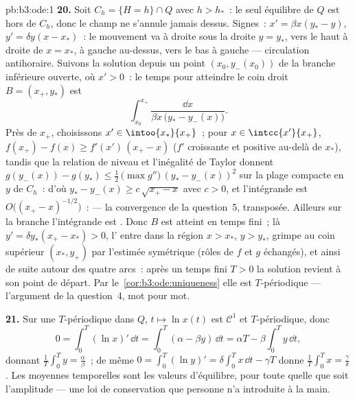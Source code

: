 \begin{solution}{pb:b3:ode:1}
\textbf{20.} Soit $C_h = \{H = h\}\cap Q$ avec $h > h_*$~:
le seul équilibre de $Q$ est hors de $C_h$, donc le champ
ne s'annule jamais dessus. Signes~: $x' = \beta x(y_* - y)$,
$y' = \delta y(x - x_*)$~: le mouvement va à droite sous la
droite $y = y_*$, vers le haut à droite de $x = x_*$, à
gauche au-dessus, vers le bas à gauche --- circulation
antihoraire. Suivons la solution depuis un point $(x_0,
y_-(x_0))$ de la branche inférieure ouverte, où $x' > 0$~: le
temps pour atteindre le coin droit $B = (x_+, y_*)$ est
\[
\int_{x_0}^{x_+}\frac{\dd x}{\beta x\,\bigl(y_* -
y_-(x)\bigr)} .
\]
Près de $x_+$, choisissons $x' \in \intoo{x_*}{x_+}$~; pour
$x \in \intcc{x'}{x_+}$, $f(x_+) - f(x) \geq f'(x')\,(x_+ -
x)$ ($f'$ croissante et positive au-delà de $x_*$), tandis
que la relation de niveau et l'inégalité de Taylor donnent
$g(y_-(x)) - g(y_*) \leq \frac12\,\bigl(\max g''\bigr)\,(y_*
- y_-(x))^2$ sur la plage compacte en $y$ de $C_h$~: d'où
$y_* - y_-(x) \geq c\,\sqrt{x_+ - x}$ avec $c > 0$, et
l'intégrande est $O\bigl((x_+ - x)^{-1/2}\bigr)$~: 
--- la convergence de la question~5, transposée. Ailleurs
sur la branche l'intégrande est . Donc $B$ est
atteint en temps fini~; là $y' = \delta y_*(x_+ - x_*) > 0$,
l' entre dans la région $x > x_*$, $y > y_*$, grimpe
au coin supérieur $(x_*, y_+)$ par l'estimée symétrique
(rôles de $f$ et $g$ échangés), et ainsi de suite autour des
quatre arcs~: après un temps fini $T > 0$ la solution
revient à son point de départ. Par
le~\cref{cor:b3:ode:uniqueness} elle est $T$-périodique ---
l'argument de la question~4, mot pour mot.

\textbf{21.} Sur une  $T$-périodique dans $Q$, $t
\mapsto \ln x(t)$ est $\mathcal C^1$ et $T$-périodique, donc
\[
0 = \int_0^T(\ln x)'\,\dd t
= \int_0^T(\alpha - \beta y)\,\dd t
= \alpha T - \beta\int_0^Ty\,\dd t ,
\]
donnant $\frac1T\int_0^Ty = \frac\alpha\beta$~; de même $0 =
\int_0^T(\ln y)' = \delta\int_0^Tx\,\dd t - \gamma T$ donne
$\frac1T\int_0^Tx = \frac\gamma\delta$. Les moyennes
temporelles sont les valeurs d'équilibre, pour toute 
quelle que soit l'amplitude --- une loi de conservation que
personne n'a introduite à la main.


\end{solution}
